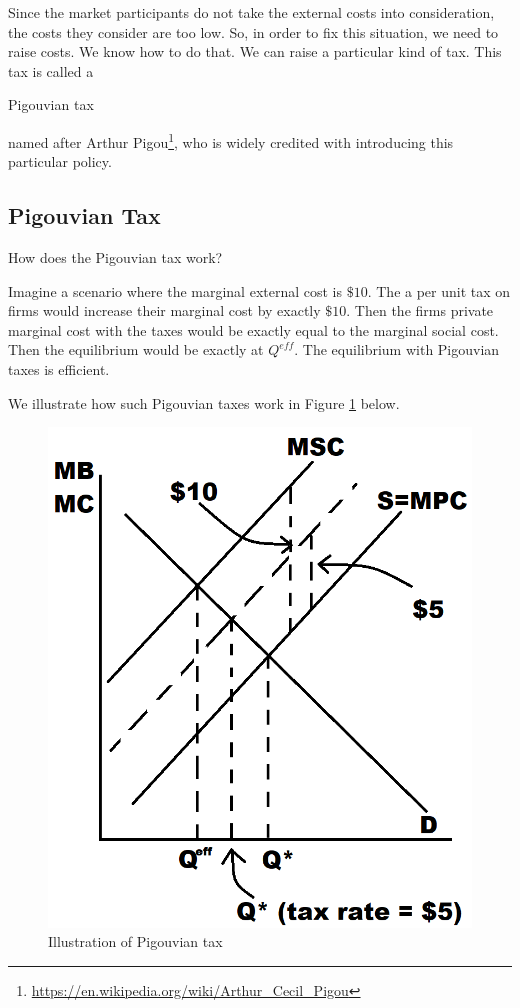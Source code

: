 \documentclass[
]{book}
\begin{document}
Since the market participants do not take the external costs into consideration, the costs they consider are too low. So, in order to fix this situation, we need to raise costs. We know how to do that. We can raise a particular kind of tax. This tax is called a

\begin{center}
Pigouvian tax

\end{center}

named after Arthur Pigou\footnote{\url{https://en.wikipedia.org/wiki/Arthur_Cecil_Pigou}}, who is widely credited with introducing this particular policy.

\hypertarget{pigouvian-tax}{%
\subsection{Pigouvian Tax}\label{pigouvian-tax}}

How does the Pigouvian tax work?

Imagine a scenario where the marginal external cost is \(\$10\). The a per unit tax on firms would increase their marginal cost by exactly \(\$10\). Then the firms private marginal cost with the taxes would be exactly equal to the marginal social cost. Then the equilibrium would be exactly at \(Q^{eff}\). The equilibrium with Pigouvian taxes is efficient.

We illustrate how such Pigouvian taxes work in Figure \ref{fig:extfig2} below.

\begin{figure}

{\centering \includegraphics[width=0.75\linewidth]{img/externalities/extfig2} 

}

\caption{Illustration of Pigouvian tax}\label{fig:extfig2}
\end{figure}
\end{document}
